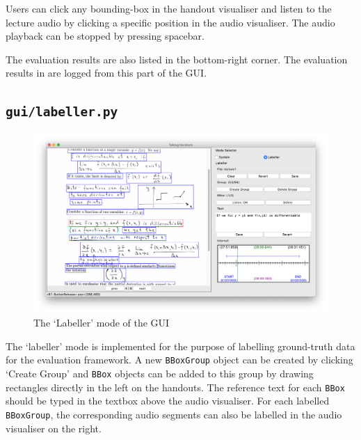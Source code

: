 Users can click any bounding-box in the handout visualiser and listen to the lecture audio by clicking a specific position in the audio visualiser. The audio playback can be stopped by pressing spacebar. 

The evaluation results are also listed in the bottom-right corner. The evaluation results in  are logged from this part of the GUI.

\subsection{\texttt{gui/labeller.py}}

\begin{figure}[!ht]
    \centering
    \includegraphics[width=.9\textwidth]{gui-labeller.png}
    \caption{The `Labeller' mode of the GUI}
    \label{fig:gui-labeller}
\end{figure}

The `labeller' mode is implemented for the purpose of labelling ground-truth data for the evaluation framework. A new \texttt{BBoxGroup} object can be created by clicking `Create Group' and \texttt{BBox} objects can be added to this group by drawing rectangles directly in the left on the handouts. The reference text for each \texttt{BBox} should be typed in the textbox above the audio visualiser. For each labelled \texttt{BBoxGroup}, the corresponding audio segments can also be labelled in the audio visualiser on the right.

